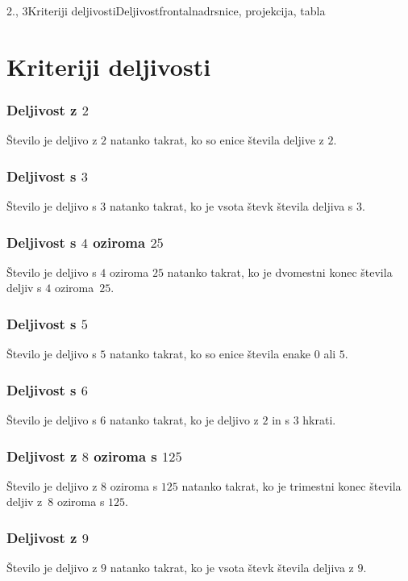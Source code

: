 \begin{priprava}{2., 3}{}{Kriteriji deljivosti}{Deljivost}{frontalna}{drsnice, projekcija, tabla}


    \section{Kriteriji deljivosti}
    
    \subsubsection*{Deljivost z $2$}
        Število je deljivo z $2$ natanko takrat, ko so enice števila deljive z $2$.

    \subsubsection*{Deljivost s $3$}
        Število je deljivo s $3$ natanko takrat, ko je vsota števk števila deljiva s $3$.

    \subsubsection*{Deljivost s $4$ oziroma $25$}
        Število je deljivo s $4$ oziroma $25$ natanko takrat, ko je dvomestni konec števila deljiv s $4$ oziroma~$25$.

    \subsubsection*{Deljivost s $5$}
        Število je deljivo s $5$ natanko takrat, ko so enice števila enake $0$ ali $5$.

    \subsubsection*{Deljivost s $6$}
        Število je deljivo s $6$ natanko takrat, ko je deljivo z $2$ in s $3$ hkrati.

    \subsubsection*{Deljivost z $8$ oziroma s $125$}
        Število je deljivo z $8$ oziroma s $125$ natanko takrat, ko je trimestni konec števila deljiv z~$8$ oziroma s $125$.

    \subsubsection*{Deljivost z $9$}
        Število je deljivo z $9$ natanko takrat, ko je vsota števk števila deljiva z $9$.


\end{priprava}
